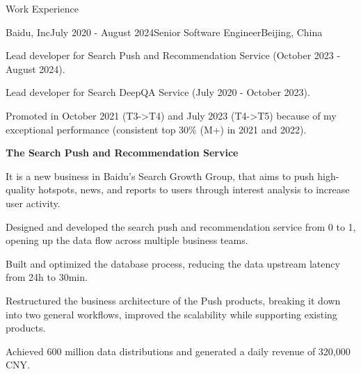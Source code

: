 \documentclass[
	11pt, %
]{resume} %
\begin{document}
\begin{rSection}{Work Experience}

    \begin{rSubsection}{Baidu, Inc}{July 2020 - August 2024}{Senior Software Engineer}{Beijing, China}
    \item Lead developer for Search Push and Recommendation Service (October 2023 - August 2024).
    \item Lead developer for Search DeepQA Service (July 2020 - October 2023).
    \item Promoted in October 2021 (T3->T4) and July 2023 (T4->T5) because of my exceptional performance (consistent top 30\% (M+) in 2021 and 2022).

    \vspace{3ex}

    \textbf{The Search Push and Recommendation Service}
        \item It is a new business in Baidu's Search Growth Group, that aims to push high-quality hotspots, news, and reports to users through interest analysis to increase user activity.
        \item Designed and developed the search push and recommendation service from 0 to 1, opening up the data flow across multiple business teams.
        \item Built and optimized the database process, reducing the data upstream latency from 24h to 30min.
        \item Restructured the business architecture of the Push products, breaking it down into two general workflows, improved the scalability while supporting existing products.
        \item Achieved 600 million data distributions and generated a daily revenue of 320,000 CNY.

    \vspace{1ex}


\end{rSubsection}
\end{rSection}
\end{document}
